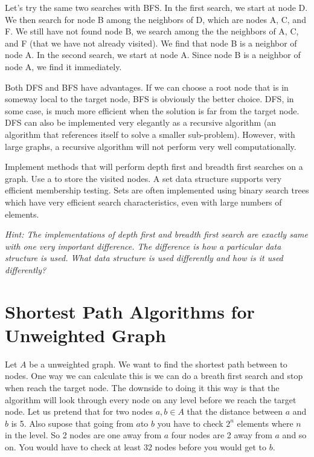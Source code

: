 Let's try the same two searches with BFS.
In the first search, we start at node D.
We then search for node B among the neighbors of D, which are nodes A, C, and F.
We still have not found node B, we search among the the neighbors of A, C, and F (that we have not already visited).
We find that node B is a neighbor of node A.
In the second search, we start at node A.  Since node B is a neighbor of node A, we find it immediately.

Both DFS and BFS have advantages.  
If we can choose a root node that is in someway local to the target node, BFS is obviously the better choice.
DFS, in some case, is much more efficient when the solution is far from the target node.
DFS can also be implemented very elegantly as a recursive algorithm (an algorithm that references itself to solve a smaller sub-problem).
However, with large graphs, a recursive algorithm will not perform very well computationally.

\begin{problem}
Implement methods that will perform depth first and breadth first searches on a graph.
Use a  to store the visited nodes.  A set data structure supports very efficient membership testing.
Sets are often implemented using binary search trees which have very efficient search characteristics, even with large numbers of elements.

\textit{Hint: The implementations of depth first and breadth first search are exactly same with one very important difference.
The difference is how a particular data structure is used.  What data structure is used differently and how is it used differently?}
\end{problem}

\section*{Shortest Path Algorithms for Unweighted Graph}
Let $A$ be a unweighted graph. We want to find the shortest path between to nodes. One way we can calculate this is we can do a breath first search and stop when reach the target node. The downside to doing it this way is that the algorithm will look through every node on any level before we reach the target node. Let us pretend that for two nodes $a, b \in A$ that the distance between $a$ and $b$ is 5. Also supose that going from $a$to $b$ you have to check $2^n$ elements where $n$ in the level. So 2 nodes are one away from $a$ four nodes are 2 away from $a$ and so on. You would have to check at least 32 nodes before you would get to $b$.

